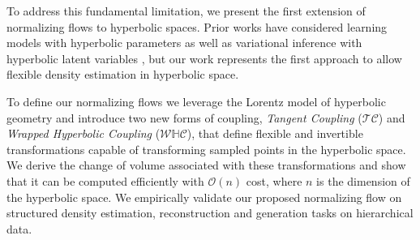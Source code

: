 To address this fundamental limitation, we present the first extension of normalizing flows to hyperbolic spaces. 
Prior works have considered learning models with hyperbolic parameters  \cite{liu2019hyperbolic,nickel2018learning} as well as variational inference with hyperbolic latent variables \cite{nagano2019wrapped,mathieu2019continuous}, but our work represents the first approach to allow flexible density estimation in hyperbolic space. 

To define our normalizing flows we leverage the Lorentz model of hyperbolic geometry and introduce two new forms of coupling, {\em Tangent Coupling} ($\mathcal{TC}$) and {\em Wrapped Hyperbolic Coupling} ($\mathcal{W}\mathbb{H}\mathcal{C}$), that define flexible and invertible transformations capable of transforming sampled points in the hyperbolic space. 
We derive the change of volume associated with these transformations and show that it can be computed efficiently with $\mathcal{O}(n)$ cost, where $n$ is the dimension of the hyperbolic space.
We empirically validate our proposed normalizing flow on structured density estimation, reconstruction and generation tasks on hierarchical data. 

